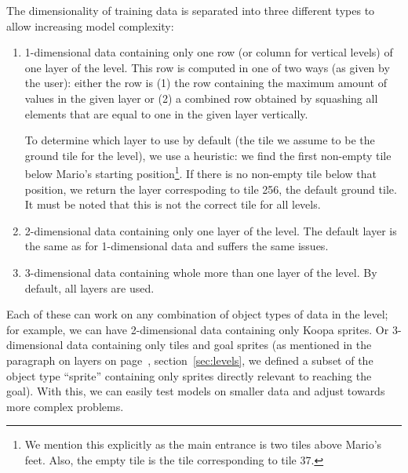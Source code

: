 The dimensionality of training data is separated into three different
types to allow increasing model complexity:
\begin{enumerate}
\item 1-dimensional data containing only one row (or column for
  vertical levels) of one layer of the level. This row is computed in
  one of two ways (as given by the user): either the row is (1) the
  row containing the maximum amount of values in the given layer or
  (2) a combined row obtained by squashing all elements that are equal
  to one in the given layer vertically.

  To determine which layer to use by default (the tile we assume to be
  the ground tile for the level), we use a heuristic: we find the
  first non-empty tile below Mario's starting position\footnote{We
    mention this explicitly as the main entrance is two tiles above
    Mario's feet. Also, the empty tile is the tile corresponding to
    tile 37.}. If there is no non-empty tile below that position, we
  return the layer correspoding
  to tile 256, the default ground tile. \\
  It must be noted that this is not the correct tile for all levels.
\item 2-dimensional data containing only one layer of the level. The
  default layer is the same as for 1-dimensional data and suffers the
  same issues.
\item 3-dimensional data containing whole more than one layer of the
  level. By default, all layers are used.
\end{enumerate}

Each of these can work on any combination of object types of data in
the level; for example, we can have 2-dimensional data containing only
Koopa sprites. Or 3-dimensional data containing only tiles and goal
sprites (as mentioned in the paragraph on layers on
page~\pageref{par:layers}, section~\ref{sec:levels}, we defined a
subset of the object type ``sprite'' containing only sprites directly
relevant to reaching the goal). With this, we can easily test models
on smaller data and adjust towards more complex problems.

